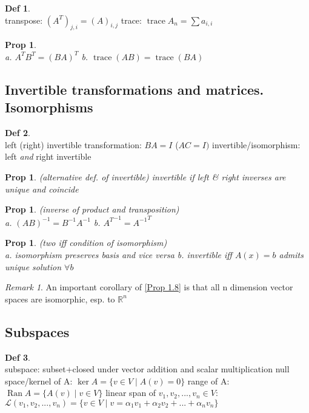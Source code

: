 \documentclass[hidelinks]{article}
\theoremstyle{definition}
\newtheorem*{defin}{Def}
\theoremstyle{plain}
\newtheorem{proposition}[theorem]{Prop}
\theoremstyle{remark}
\newtheorem*{remark}{Remark}
\DeclareMathOperator{\range}{Ran}
\DeclareMathOperator{\trace}{trace}
\begin{document}
\begin{defin}~\\
transpose: $(A^T)_{j,i}=(A)_{i,j}$ \newline
trace: $\trace A_n=\sum a_{i,i}$
\end{defin}

\begin{proposition}~\\
\indent a. $A^TB^T=(BA)^T$\newline
\indent b. $\trace(AB)=\trace(BA)$
\end{proposition}

\subsection{Invertible transformations and matrices. Isomorphisms}

\begin{defin}~\\
left (right) invertible transformation: $BA=I$ ($AC=I)$\newline
invertible/isomorphism: left \emph{and} right invertible
\end{defin}

\begin{proposition} (alternative def. of invertible)
invertible if left \& right inverses are unique and coincide
\end{proposition}

\begin{proposition} (inverse of product and transposition)\\
\indent a. $(AB)^{-1}=B^{-1}A^{-1}$\newline
\indent b. ${A^T}^{-1}={A^{-1}}^T$
\end{proposition}

\begin{proposition}\label{Prop 1.8} (two iff condition of isomorphism)\\
\indent a. isomorphism preserves basis and vice versa \newline
\indent b. invertible iff $A(x)=b$ admits unique solution $\forall b$
\end{proposition}

\begin{remark}
An important corollary of \autoref{Prop 1.8} is that all n dimension vector spaces are isomorphic, esp. to $\mathbb{R}^n$
\end{remark}

\subsection{Subspaces}
\begin{defin}~\\
subspace: subset+closed under vector addition and scalar multiplication \newline
\indent null space/kernel of A: $\ker A=\{v\in V\mid A(v)=0\}$ \newline
\indent range of A: $\range A=\{A(v)\mid v\in V\}$ \newline
\indent linear span of $v_1,v_2,...,v_n\in V$: $\mathscr{L}(v_1,v_2,...,v_n)=\{v\in V\mid v=\alpha_1v_1+\alpha_2v_2+...+\alpha_nv_n\}$
\end{defin}
\end{document}
